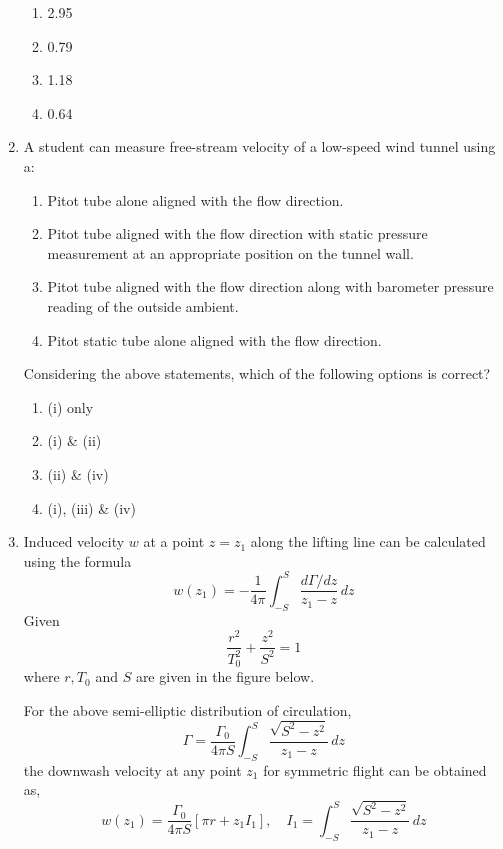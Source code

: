 \documentclass[journal]{IEEEtran}
\begin{document}
\begin{enumerate}
\begin{multicols}{2}
\begin{enumerate}
    \item 2.95
    \item 0.79
    \item 1.18
    \item 0.64
\end{enumerate}
\end{multicols}
\hfill{}

\item \quad A student can measure free-stream velocity of a low-speed wind tunnel using a:
\begin{enumerate}[label=(\roman*)]
    \item Pitot tube alone aligned with the flow direction.
    \item Pitot tube aligned with the flow direction with static pressure measurement at an appropriate position on the tunnel wall.
    \item Pitot tube aligned with the flow direction along with barometer pressure reading of the outside ambient.
    \item Pitot static tube alone aligned with the flow direction.
\end{enumerate}

Considering the above statements, which of the following options is correct?
\begin{multicols}{2}
\begin{enumerate}
    \item (i) only
    \item (i) \& (ii)
    \item (ii) \& (iv)
    \item (i), (iii) \& (iv)
\end{enumerate}
\end{multicols}
\hfill{}

\item \quad Induced velocity $w$ at a point $z = z_1$ along the lifting line can be calculated using the formula  
$$
w(z_1) = -\frac{1}{4\pi} \int_{-S}^S \frac{d\Gamma/dz}{z_1 - z} \, dz
$$
Given  
$$
\frac{r^2}{T_0^2} + \frac{z^2}{S^2} = 1
$$ 
where $r, T_0$ and $S$ are given in the figure below.  

For the above semi-elliptic distribution of circulation,  
$$
\Gamma = \frac{\Gamma_0}{4\pi S} \int_{-S}^S \frac{\sqrt{S^2 - z^2}}{z_1 - z} \, dz
$$ 
the downwash velocity at any point $z_1$ for symmetric flight can be obtained as,  
$$
w(z_1) = \frac{\Gamma_0}{4\pi S} \left[ \pi r + z_1 I_1 \right], \quad I_1 = \int_{-S}^S \frac{\sqrt{S^2 - z^2}}{z_1 - z} \, dz
$$  


\end{enumerate}
\end{document}
